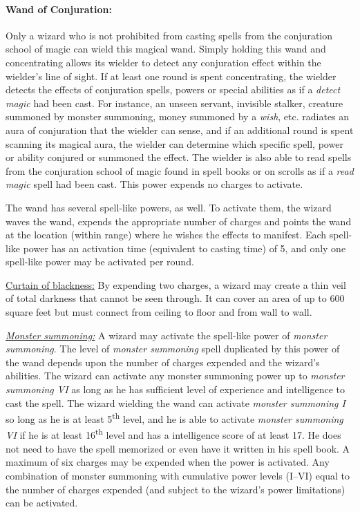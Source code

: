 \begin{multicols}{2}
\paragraph{Wand of Conjuration:} Only a wizard who is not prohibited from casting spells from the conjuration school of magic can wield this magical wand.  Simply holding this wand and concentrating allows its wielder to detect any conjuration effect within the wielder's line of sight.  If at least one round is spent concentrating, the wielder detects the effects of conjuration spells, powers or special abilities as if a \textit{detect magic} had been cast.  For instance, an unseen servant, invisible stalker, creature summoned by monster summoning, money summoned by a \textit{wish}, etc. radiates an aura of conjuration that the wielder can sense, and if an additional round is spent scanning its magical aura, the wielder can determine which specific spell, power or ability conjured or summoned the effect.  The wielder is also able to read spells from the conjuration school of magic found in spell books or on scrolls as if a \textit{read magic} spell had been cast.  This power expends no charges to activate.
 
The wand has several spell-like powers, as well.  To activate them, the wizard waves the wand, expends the appropriate number of charges and points the wand at the location (within range) where he wishes the effects to manifest.  Each spell-like power has an activation time (equivalent to casting time) of 5, and only one spell-like power may be activated per round.  

\underline{Curtain of blackness:} By expending two charges, a wizard may create a thin veil of total darkness that cannot be seen through.  It can cover an area of up to 600 square feet but must connect from ceiling to floor and from wall to wall.

\underline{\textit{Monster summoning:}} A wizard may activate the spell-like power of \textit{monster summoning}.  The level of \textit{monster summoning} spell duplicated by this power of the wand depends upon the number of charges expended and the wizard's abilities.  The wizard can activate any monster summoning power up to \textit{monster summoning VI} as long as he has sufficient level of experience and intelligence to cast the spell.  The wizard wielding the wand can activate \textit{monster summoning I} so long as he is at least 5\textsuperscript{th} level, and he is able to activate \textit{monster summoning VI} if he is at least 16\textsuperscript{th} level and has a intelligence score of at least 17.  He does not need to have the spell memorized or even have it written in his spell book.  A maximum of six charges may be expended when the power is activated.  Any combination of monster summoning with cumulative power levels (I--VI) equal to the number of charges expended (and subject to the wizard's power limitations) can be activated.  


\end{multicols}
